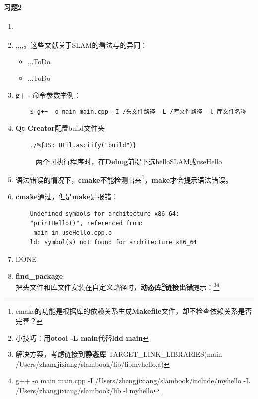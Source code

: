\documentclass[12pt,a4paper]{ctexart}
\begin{document}
\paragraph{习题2}
\begin{enumerate}
	\item \cite{LiuHaoMin2016,梁明杰2013基于图优化的同时定位与地图创建综述}
	\item \cite{Cadena2016},\cite{Chen2007a},\cite{Chen2012b},\cite{Boal2014},\cite{Fuentes-Pacheco2015}。这些文献关于SLAM的看法与\cite{Gao2017SLAM}的异同：
	\begin{itemize}
		\item ...ToDo
		\item ...ToDo
	\end{itemize}
	\item \textbf{g++}命令参数举例：
	\begin{verbatim}
	$ g++ -o main main.cpp -I /头文件路径 -L /库文件路径 -l 库文件名称
	\end{verbatim}
	\item \textbf{Qt Creator}配置build文件夹
	\begin{verbatim}
	./%{JS: Util.asciify("build")}
	\end{verbatim}
	\begin{figure}
		\centering
		\caption{两个可执行程序时，在\textbf{Debug}前提下选helloSLAM或useHello}
		\label{fig:debug}
	\end{figure}
	\item 语法错误的情况下，\textbf{cmake}不能检测出来\footnote{cmake的功能是根据库的依赖关系生成\textbf{Makefile}文件，却不检查依赖关系是否完善？}，\textbf{make}才会提示语法错误。
	\item \textbf{cmake}通过，但是\textbf{make}是报错：
	\begin{verbatim}
	Undefined symbols for architecture x86_64:
	"printHello()", referenced from:
	_main in useHello.cpp.o
	ld: symbol(s) not found for architecture x86_64
	\end{verbatim}
	\item DONE
	\item \textbf{find\_package}\\
	把头文件和库文件安装在自定义路径时，\textbf{动态库\footnote{小技巧：用\textbf{otool -L main}代替\textbf{ldd main}}链接出错}提示：\footnote{解决方案，考虑链接到\textbf{静态库} TARGET\_LINK\_LIBRARIES(main /Users/zhangjixiang/slambook/lib/libmyhello.a) }\footnote{g++ -o main main.cpp -I /Users/zhangjixiang/slambook/include/myhello -L /Users/zhangjixiang/slambook/lib -l myhello}

\end{enumerate}
\end{document}
